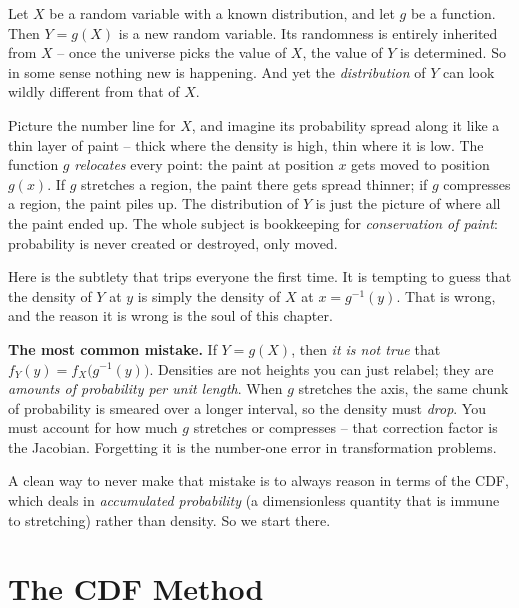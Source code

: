 Let $X$ be a random variable with a known distribution, and let $g$ be a function. Then
$Y = g(X)$ is a new random variable. Its randomness is entirely inherited from $X$ -- once
the universe picks the value of $X$, the value of $Y$ is determined. So in some sense
nothing new is happening. And yet the \emph{distribution} of $Y$ can look wildly different
from that of $X$.

\begin{intuitionbox}
Picture the number line for $X$, and imagine its probability spread along it like a thin
layer of paint -- thick where the density is high, thin where it is low. The function $g$
\emph{relocates} every point: the paint at position $x$ gets moved to position $g(x)$.
If $g$ stretches a region, the paint there gets spread thinner; if $g$ compresses a
region, the paint piles up. The distribution of $Y$ is just the picture of where all the
paint ended up. The whole subject is bookkeeping for \emph{conservation of paint}:
probability is never created or destroyed, only moved.
\end{intuitionbox}

Here is the subtlety that trips everyone the first time. It is tempting to guess that the
density of $Y$ at $y$ is simply the density of $X$ at $x = g^{-1}(y)$. That is wrong, and
the reason it is wrong is the soul of this chapter.

\begin{trapbox}
\textbf{The most common mistake.} If $Y = g(X)$, then \emph{it is not true} that
$f_Y(y) = f_X\!\big(g^{-1}(y)\big)$. Densities are not heights you can just relabel; they
are \emph{amounts of probability per unit length}. When $g$ stretches the axis, the same
chunk of probability is smeared over a longer interval, so the density must \emph{drop}.
You must account for how much $g$ stretches or compresses -- that correction factor is the
Jacobian. Forgetting it is the number-one error in transformation problems.
\end{trapbox}

A clean way to never make that mistake is to always reason in terms of the CDF, which
deals in \emph{accumulated probability} (a dimensionless quantity that is immune to
stretching) rather than density. So we start there.

\section{The CDF Method}
\label{ch16:cdf-method}

